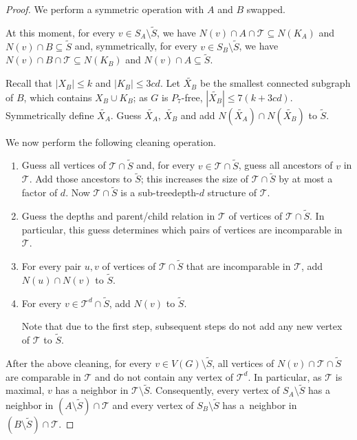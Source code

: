 \documentclass[11pt,a4paper]{article}
\theoremstyle{definition}
\def\T{\mathcal{T}}
\newcommand{\Jadwiga}[2][]{\todo[color=yellow!80,inline,#1]{{\textbf{J:} #2}}}
\begin{document}
\begin{proof}
We perform a symmetric operation with $A$ and $B$ swapped.

At this moment, for every $v \in S_A \setminus \widetilde{S}$, 
we have $N(v) \cap A \cap \T \subseteq N(K_A)$ and $N(v) \cap B \subseteq \widetilde{S}$
and, symmetrically, 
for every $v \in S_B \setminus \widetilde{S}$, 
we have $N(v) \cap B \cap \T \subseteq N(K_B)$ and $N(v) \cap A \subseteq \widetilde{S}$.

Recall that $|X_B| \leq k$ and $|K_B| \leq 3cd$. 
Let $\widetilde{X_B}$ be the smallest connected subgraph of $B$, which contains $X_B\cup K_B$;
as $G$ is $P_7$-free, $|\widetilde{X_B}| \leq 7(k + 3cd)$. 
Symmetrically define $\widetilde{X_A}$. 
Guess $\widetilde{X_A}$, $\widetilde{X_B}$ and add $N(\widetilde{X_A}) \cap N(\widetilde{X_B})$
to $\widetilde{S}$. 

We now perform the following cleaning operation.
\begin{enumerate}
    \item Guess all vertices of $\T \cap \widetilde{S}$
and, for every $v \in \T \cap \widetilde{S}$, guess all ancestors of $v$ in $\T$. 
Add those ancestors to $\widetilde{S}$; this increases the size of $\T \cap \widetilde{S}$
by at most a factor of $d$. Now $\T \cap \widetilde{S}$ is a sub-treedepth-$d$ structure
of $\T$. 

    \item Guess the depths and parent/child relation in $\T$
    of vertices of $\T \cap \widetilde{S}$. In particular, this guess determines
    which pairs of vertices are incomparable in $\T$.
    \item For every pair $u,v$ of vertices of $\T \cap \widetilde{S}$ that are incomparable in $\T$, add $N(u) \cap N(v)$ to $\widetilde{S}$. 
    \item For every $v \in \T^d \cap \widetilde{S}$, add $N(v)$ to $\widetilde{S}$.
    
    Note that due to the first step, subsequent steps
    do not add any new vertex of $\T$ to $\widetilde{S}$. 
\end{enumerate}
After the above cleaning, for every $v \in V(G) \setminus \widetilde{S}$, all
vertices of $N(v) \cap \T \cap \widetilde{S}$ are comparable in $\T$
and do not contain any vertex of $\T^d$. In particular, as $\T$ is maximal, $v$ has
a neighbor in $\T \setminus \widetilde{S}$.
Consequently, every vertex of $S_A \setminus \widetilde{S}$ has a neighbor
in $(A \setminus \widetilde{S}) \cap \T$ and every vertex 
of $S_B \setminus \widetilde{S}$ has a~neighbor in 
$(B \setminus \widetilde{S}) \cap \T$. 


\end{proof}
\end{document}
